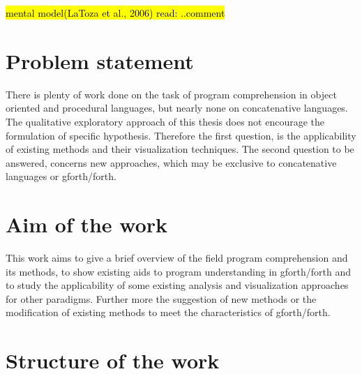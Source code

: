 \hl{mental model(LaToza et al., 2006) read: ..comment}
\begin{comment}
\@inproceedings\{Lieberman:1995:BGC:223904.223969,
author = \{Lieberman, Henry and Fry, Christopher\},
title = \{Bridging the Gulf Between Code and Behavior in Programming\},
booktitle = \{Proceedings of the SIGCHI Conference on Human Factors in Computing Systems\},
series = \{CHI '95\},
year = \{1995\},
isbn = \{0-201-84705-1\},
location = \{Denver, Colorado, USA\},
pages = \{480--486\},
numpages = \{7\},
url = \{http://dx.doi.org/10.1145/223904.223969\},
doi = \{10.1145/223904.223969\},
acmid = \{223969\},
publisher = \{ACM Press/Addison-Wesley Publishing Co.\},
address = \{New York, NY, USA\},
\}
\end{comment}


\section*{Problem statement}

There is plenty of work done on the task of program comprehension in object oriented and procedural languages\cite{Cornelissen:2009:SSP:1638616.1639301}, but nearly none on concatenative languages. The qualitative exploratory approach of this thesis does not encourage the formulation of specific hypothesis. Therefore the first question, is the applicability of existing methods and their visualization techniques. The second question to be answered, concerns new approaches, which may be exclusive to concatenative languages or gforth/forth.

\section*{Aim of the work}

This work aims to give a brief overview of the field program comprehension and its methods, to show existing aids to program understanding in gforth/forth and to study the applicability of some existing analysis and visualization approaches for other paradigms. Further more the suggestion of new methods or the modification of existing methods to meet the characteristics of gforth/forth.

\section*{Structure of the work}

